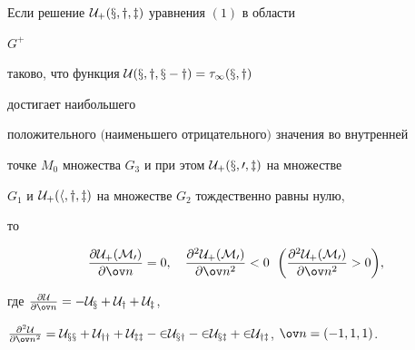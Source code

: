 \begin{lem} Если решение $\cal U_+(x,y,z)$ уравнения $(1)$ в области 


$G^+$ 


таково, что функция $\cal U(x,y,x-y)=\tau_1(x,y)$


достигает наибольшего  


положительного $($наименьшего отрицательного$)$ значения во внутренней 


точке $M_0$ множества $G_3$ и при этом $\cal U_+(x,0,z)$ на множестве 


$G_1$ и $\cal U_+(h,y,z)$ на множестве $G_2$ тождественно равны нулю, 


то 


$$ 


\frac{\partial\cal U_+(M_0)}{\partial\ov n}=0,\quad 


\frac{\partial^2\cal U_+(M_0)}{\partial\ov n^2}<0 


\ \; \bigg( 


\frac{\partial^2\cal U_+(M_0)}{\partial\ov n^2}>0\bigg), 


$$ 


где $\frac{\partial\cal U}{\partial\ov n}=-\cal U_x+\cal U_y+\cal U_z$, 


$\frac{\partial^2\cal U}{\partial\ov n^2}=\cal U_{xx}+\cal U_{yy}+\cal 


U_{zz}-2\cal U_{xy}-2\cal U_{xz}+2\cal U_{yz}$, $\ov n=(-1,1,1)$. 


\end{lem} 


 



